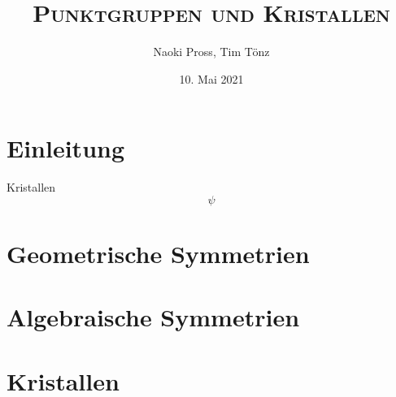 \documentclass[12pt, xcolor, aspectratio=169]{beamer}
\title{\LARGE \scshape Punktgruppen und Kristallen}
\author[N. Pross, T. T\"onz]{Naoki Pross, Tim T\"onz}
\institute{Hochschule f\"ur Technik OST, Rapperswil}
\date{10. Mai 2021}
\begin{document}
\begin{frame}{}
\titlepage
\end{frame}


\section{Einleitung}
\begin{frame}{Kristallen}
\[
  \psi
\]
\end{frame}

\section{Geometrische Symmetrien}
\section{Algebraische Symmetrien}
\section{Kristallen}
\end{document}
